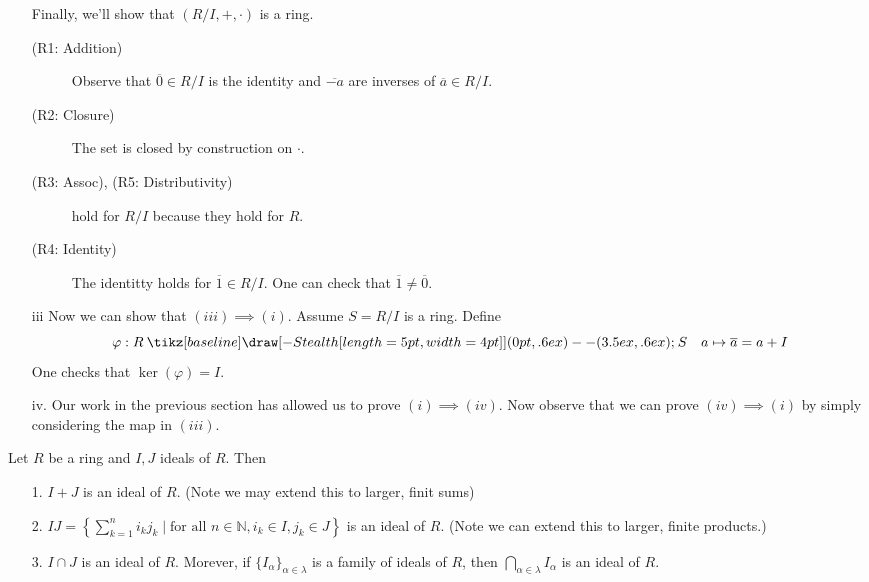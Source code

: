\documentclass[12pt,letterpaper]{algebra_book}
\renewcommand{\to}{\mathbin{\tikz[baseline] \draw[-{Stealth[length=5pt,width=4pt]}] (0pt,.6ex) -- (3.5ex,.6ex);}}
\renewcommand{\phi}{\varphi}
\theoremstyle{definition}
\begin{document}
\begin{prf}
\begin{itemize}
            Finally, we'll show that $(R/I, +, \cdot)$ is a ring. 
            \begin{description}
                \item[(R1: Addition)] Observe that $\overline{0}
                \in R/I$ is the identity and $\overline{-a}$ are
                inverses of $\overline{a} \in R/I$. 

                \item[(R2: Closure)] The set is closed by
                construction on $\cdot$. 

                \item[(R3: Assoc), (R5: Distributivity)] hold for
                $R/I$ because they hold for $R$. 

                \item[(R4: Identity)] The identitty holds for
                $\overline{1} \in R/I$. One can check that
                $\overline{1} \ne \overline{0}$. 
            \end{description}
            \item[iii] Now we can show that $(iii) \implies (i)$.
            Assume $S = R/I$ is a ring. Define 
            \[
                \phi: R \to S \quad a \mapsto \overline{a} = a + I
            \]
            One checks that $\ker(\phi) = I$. 

            \item[iv.] Our work in the previous section has
            allowed us to prove $(i) \implies (iv)$. Now observe
            that we can prove $(iv) \implies (i)$ by simply
            considering the map in $(iii)$.
        \end{itemize}
    \end{prf}
    

    \begin{thm}
        Let $R$ be a ring and $I, J$ ideals of $R$. Then 
        \begin{itemize}
            \item[1.] $I +J$ is an ideal of $R.$ (Note we may
            extend this to larger, finit sums)
            \item[2.] $IJ = \left\{\displaystyle \sum_{k=1}^ni_kj_k \mid \text{for all
            } n \in \mathbb{N}, i_k \in I, j_k \in J\right\}$ is an
            ideal of $R$. (Note we can extend this to larger,
            finite products.) 
            \item[3.] $I \cap J$ is an ideal of $R$. Morever, if
            $\{I_\alpha\}_{\alpha \in \lambda}$ is a family of
            ideals of $R$, then $\bigcap\limits_{\alpha \in
            \lambda} I_\alpha$ is an ideal of $R$. 
        \end{itemize}
    \end{thm}
\end{document}
